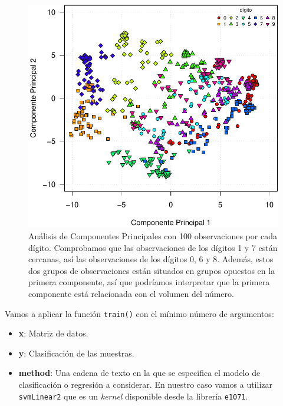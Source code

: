\documentclass[12pt,spanish,a4paper]{article}
\newenvironment{Shaded}{\begin{snugshade}}{\end{snugshade}}
\newcommand{\KeywordTok}[1]{\textcolor[rgb]{0.13,0.29,0.53}{\textbf{#1}}}
\newcommand{\DataTypeTok}[1]{\textcolor[rgb]{0.13,0.29,0.53}{#1}}
\newcommand{\DecValTok}[1]{\textcolor[rgb]{0.00,0.00,0.81}{#1}}
\newcommand{\StringTok}[1]{\textcolor[rgb]{0.31,0.60,0.02}{#1}}
\newcommand{\OperatorTok}[1]{\textcolor[rgb]{0.81,0.36,0.00}{\textbf{#1}}}
\newcommand{\NormalTok}[1]{#1}
\numberwithin{equation}{section}
\begin{document}
\begin{figure}[h]

{\centering \includegraphics[width=0.95\linewidth]{graphics/svm/pca_entrenamiento-1} 

}

\caption{Análisis de Componentes Principales con 100 observaciones por cada dígito. Comprobamos que las observaciones de los dígitos 1 y 7 están cercanas, así las observaciones de los dígitos 0, 6 y 8. Además, estos dos grupos de observaciones están situados en grupos opuestos en la primera componente, así que podríamos interpretar que la primera componente está relacionada con el volumen del número.}\label{fig:pca_entrenamiento}
\end{figure}

Vamos a aplicar la función \texttt{train()} con el mínimo número de
argumentos:

\begin{itemize}
\item
  \textbf{x}: Matriz de datos.
\item
  \textbf{y}: Clasificación de las muestras.
\item
  \textbf{method}: Una cadena de texto en la que se especifica el modelo
  de clasificación o regresión a considerar. En nuestro caso vamos a
  utilizar \texttt{svmLinear2} que es un \emph{kernel} disponible desde
  la librería \texttt{e1071}.
\end{itemize}

\begin{Shaded}
\end{Shaded}
\end{document}
